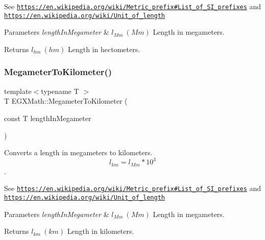 See \href{https://en.wikipedia.org/wiki/Metric_prefix#List_of_SI_prefixes}{\tt https\+://en.\+wikipedia.\+org/wiki/\+Metric\+\_\+prefix\#\+List\+\_\+of\+\_\+\+S\+I\+\_\+prefixes} and \href{https://en.wikipedia.org/wiki/Unit_of_length}{\tt https\+://en.\+wikipedia.\+org/wiki/\+Unit\+\_\+of\+\_\+length} 
\begin{DoxyParams}{Parameters}
{\em length\+In\+Megameter} & $ l_{Mm}\ (Mm)$ Length in megameters. \\
\hline
\end{DoxyParams}
\begin{DoxyReturn}{Returns}
$ l_{hm}\ (hm)$ Length in hectometers. 
\end{DoxyReturn}
\mbox{\label{group___e_g_x_math-_conversions-_length_conversions-_megameter-_s_i_gac428a2600cebd4a837801bef72380560}} 
\subsubsection{\texorpdfstring{Megameter\+To\+Kilometer()}{MegameterToKilometer()}}
{\footnotesize\ttfamily template$<$typename T $>$ \\
T E\+G\+X\+Math\+::\+Megameter\+To\+Kilometer (\begin{DoxyParamCaption}\item[{const T}]{length\+In\+Megameter }\end{DoxyParamCaption})}



Converts a length in megameters to kilometers. \[ l_{km}=l_{Mm} * 10^{3} \]. 

See \href{https://en.wikipedia.org/wiki/Metric_prefix#List_of_SI_prefixes}{\tt https\+://en.\+wikipedia.\+org/wiki/\+Metric\+\_\+prefix\#\+List\+\_\+of\+\_\+\+S\+I\+\_\+prefixes} and \href{https://en.wikipedia.org/wiki/Unit_of_length}{\tt https\+://en.\+wikipedia.\+org/wiki/\+Unit\+\_\+of\+\_\+length} 
\begin{DoxyParams}{Parameters}
{\em length\+In\+Megameter} & $ l_{Mm}\ (Mm)$ Length in megameters. \\
\hline
\end{DoxyParams}
\begin{DoxyReturn}{Returns}
$ l_{km}\ (km)$ Length in kilometers. 
\end{DoxyReturn}
\mbox{\label{group___e_g_x_math-_conversions-_length_conversions-_megameter-_s_i_gadd3d707010ed78d623f4fbb5b8d72338}} 
